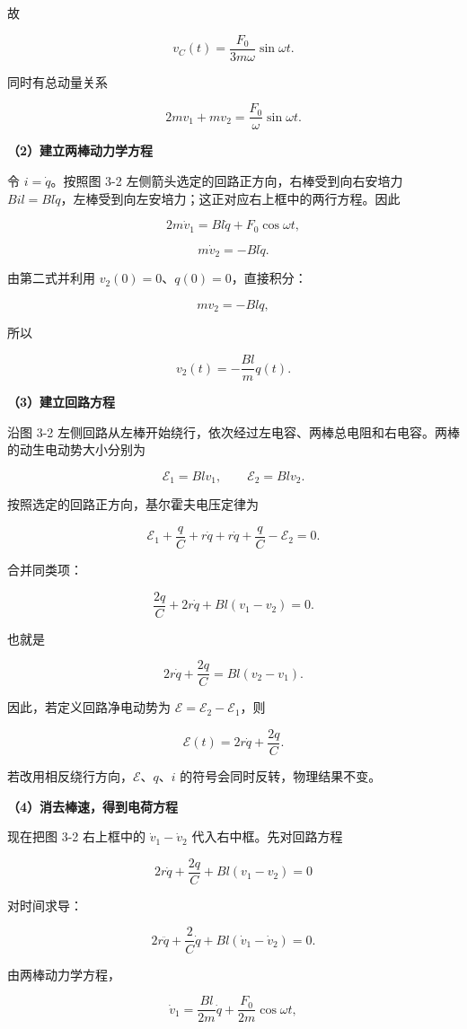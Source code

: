 \documentclass[12pt,a4paper,UTF8]{ctexart}
\begin{document}
故

\[
\boxed{v_C(t)=\frac{F_0}{3m\omega}\sin\omega t}.
\]

同时有总动量关系

\[
\boxed{2mv_1+mv_2=\frac{F_0}{\omega}\sin\omega t}.
\]

\textbf{（2）建立两棒动力学方程}

令 \(i=\dot q\)。按照图 3-2 左侧箭头选定的回路正方向，右棒受到向右安培力
\(Bil=Bl\dot q\)，左棒受到向左安培力；这正对应右上框中的两行方程。因此

\[
\boxed{2m\dot v_1=Bl\dot q+F_0\cos\omega t},
\]

\[
\boxed{m\dot v_2=-Bl\dot q}.
\]

由第二式并利用 \(v_2(0)=0\)、\(q(0)=0\)，直接积分：

\[
mv_2=-Blq,
\]

所以

\[
\boxed{v_2(t)=-\frac{Bl}{m}q(t)}.
\]

\textbf{（3）建立回路方程}

沿图 3-2
左侧回路从左棒开始绕行，依次经过左电容、两棒总电阻和右电容。两棒的动生电动势大小分别为

\[
\mathcal E_1=Blv_1,
\qquad
\mathcal E_2=Blv_2.
\]

按照选定的回路正方向，基尔霍夫电压定律为

\[
\mathcal E_1+\frac qC+r\dot q+r\dot q+\frac qC-\mathcal E_2=0.
\]

合并同类项：

\[
\frac{2q}{C}+2r\dot q+Bl(v_1-v_2)=0.
\]

也就是

\[
\boxed{2r\dot q+\frac{2q}{C}=Bl(v_2-v_1)}.
\]

因此，若定义回路净电动势为 \(\mathcal E=\mathcal E_2-\mathcal E_1\)，则

\[
\boxed{\mathcal E(t)=2r\dot q+\frac{2q}{C}}.
\]

若改用相反绕行方向，\(\mathcal E\)、\(q\)、\(i\)
的符号会同时反转，物理结果不变。

\textbf{（4）消去棒速，得到电荷方程}

现在把图 3-2 右上框中的 \(\dot v_1-\dot v_2\) 代入右中框。先对回路方程

\[
2r\dot q+\frac{2q}{C}+Bl(v_1-v_2)=0
\]

对时间求导：

\[
2r\ddot q+\frac{2}{C}\dot q+Bl(\dot v_1-\dot v_2)=0.
\]

由两棒动力学方程，

\[
\dot v_1=\frac{Bl}{2m}\dot q+\frac{F_0}{2m}\cos\omega t,
\]
\end{document}
